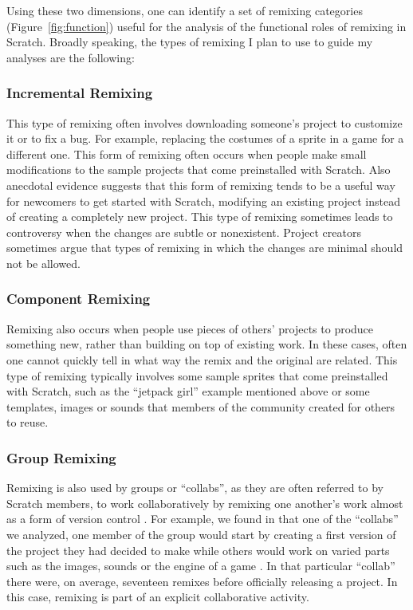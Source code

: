 Using these two dimensions, one can identify a set of remixing categories (Figure~\ref{fig:function}) useful for the analysis of the functional roles of remixing in Scratch.
Broadly speaking, the types of remixing I plan to use to guide my analyses are the following:

\subsubsection{Incremental Remixing}
This type of remixing often involves downloading someone's project to customize it or to fix a bug. 
For example, replacing the costumes of a sprite in a game for a different one. 
This form of remixing often occurs when people make small modifications to the sample projects that come preinstalled with Scratch.
Also anecdotal evidence suggests that this form of remixing tends to be a useful way for newcomers to get started with Scratch,  modifying an existing project instead of creating a completely new project.
This type of remixing sometimes leads to controversy when the changes are subtle or nonexistent.
Project creators sometimes argue that types of remixing in which the changes are minimal should not be allowed.

\subsubsection{Component Remixing}
Remixing also occurs when people use pieces of others' projects to produce something new, rather than building on top of existing work.   
In these cases, often one cannot quickly tell in what way the remix and the original are related.
This type of remixing typically involves some sample sprites that come preinstalled with Scratch, such as the ``jetpack girl'' example mentioned above or some templates, images or sounds that members of the community created for others to reuse.


\subsubsection{Group Remixing}
Remixing is also used by groups or ``collabs'', as they are often referred to by Scratch members, to work collaboratively by remixing one another's work almost as a form of version control \citep{tichy_rcs_1985}.
For example, we found in that one of the ``collabs'' we analyzed, one member of the group would start by creating a first version of the project they had decided to make while others would work on varied parts such as the images, sounds or the engine of a game \citep{aragon_tale_2009}.
In that particular ``collab'' there were, on average, seventeen remixes before officially releasing a project.
In this case, remixing is part of an explicit collaborative activity.


